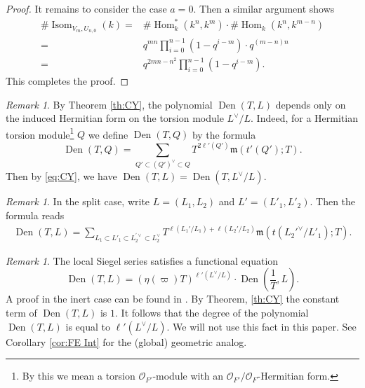 \documentclass[reqno]{amsart}
\numberwithin{equation}{section}
\DeclareMathOperator{\Hom}{Hom}
\DeclareMathOperator{\Isom}{Isom}
\DeclareMathOperator{\Den}{Den}
\newcommand\cO{\mathcal{O}}
\newcommand\fm{\mathfrak{m}}
\theoremstyle{remark}
\newtheorem{remark}[thm]{Remark}
\numberwithin{equation}{section}
\begin{document}
\begin{proof}
It remains to consider the case $a=0$. Then  a similar argument shows
   \begin{align*}
 \# \Isom_{V_{m}, U_{n,0}}(k)= &\#\Hom^*_k(k^n,k^m)\cdot  \#\Hom_k(k^n,k^{m-n})\\
 =&q^{mn}\prod_{i=0}^{n-1}(1-q^{i-m})\cdot  q^{(m-n)n}
 \\=&  q^{2mn-n^2}\prod_{i=0}^{n-1}(1-q^{i-m}).
  \end{align*}
  This completes the proof.
  
 \end{proof}
 
 \begin{remark}\label{r:Den tor} By Theorem \ref{th:CY}, the polynomial $\Den(T,L)$ depends only on the induced Hermitian form on the torsion module $L^\vee/L$. Indeed, for a Hermitian torsion module\footnote{By this we mean a torsion $\cO_{F'}$-module with an $\cO_{F'}/\cO_F$-Hermitian form.} $Q$ we define $\Den(T,Q)$ by the formula
\[
\Den(T,Q) = \sum_{Q'\subset (Q')^{\vee} \subset Q} T^{2\ell'(Q')}\fm(  t'(Q');T). 
\]
Then by \eqref{eq:CY}, we have $\Den(T, L) = \Den(T, L^\vee/L)$. 
\end{remark}

\begin{remark}
In the split case, write $L=(L_1,L_2)$ and $L'=(L'_1,L'_2)$. Then the formula reads
\begin{eqnarray*}
\Den(T,L) = \sum_{L_1 \subset L'_1 \subset L_2^{'\vee} \subset L_2^{\vee}  } T^{\ell(L_1'/L_1)+\ell(L_2'/L_2)}\fm(t({L_2'}^{\vee}/L'_1);T).
\end{eqnarray*}
\end{remark}


\begin{remark}
The local Siegel series satisfies a functional equation 
\begin{equation}
  \label{eq:functionalequation}
  \Den(T,L)=(\eta(\varpi) T)^{\ell'(L^\vee/L)}\cdot \Den\left(\frac{1}{T},L\right).
\end{equation}A proof in the inert case can be found in \cite[Theorem 5.3]{Hironaka2012}. By Theorem, \ref{th:CY} the constant term of $  \Den(T,L)$ is $1$. It follows that the degree of the polynomial $\Den(T,L)$ is equal to $\ell'(L^\vee/L)$. We will not use this fact in this paper.
See Corollary \ref{cor:FE Int} for the (global) geometric analog.
\end{remark}
\end{document}
